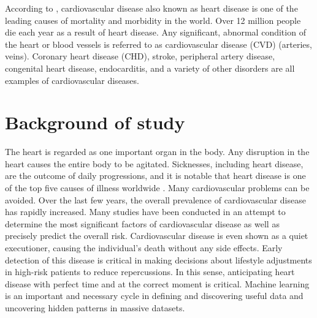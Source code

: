 According to , cardiovascular disease also known as heart disease is one of the leading causes of mortality and morbidity in the world. Over 12 million people die each year as a result of heart disease. Any significant, abnormal condition of the heart or blood vessels is referred to as cardiovascular disease (CVD) (arteries, veins). Coronary heart disease (CHD), stroke, peripheral artery disease, congenital heart disease, endocarditis, and a variety of other disorders are all examples of cardiovascular diseases.




\section{Background of study}
The heart is regarded as one important organ in the body. Any disruption in the heart causes the entire body to be agitated. Sicknesses, including heart disease, are the outcome of daily progressions, and it is notable that heart disease is one of the top five causes of illness worldwide \citep{2021Cardiovascular}. Many cardiovascular problems can be avoided. Over the last few years, the overall prevalence of cardiovascular disease has rapidly increased. Many studies have been conducted in an attempt to determine the most significant factors of cardiovascular disease as well as precisely predict the overall risk. Cardiovascular disease is even shown as a quiet executioner, causing the individual's death without any side effects. Early detection of this disease is critical in making decisions about lifestyle adjustments in high-risk patients to reduce repercussions. In this sense, anticipating heart disease with perfect time and at the correct moment is critical. Machine learning is an important and necessary cycle in defining and discovering useful data and uncovering hidden patterns in massive datasets.

